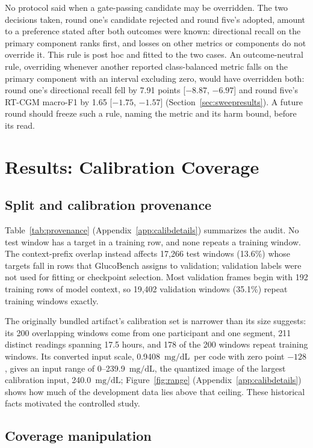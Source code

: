 \documentclass[10pt,twocolumn]{article}
\newcommand{\mgdl}{\ensuremath{\mathrm{mg/dL}}}
\begin{document}
No protocol said when a gate-passing candidate may be overridden. The two
decisions taken, round one's candidate rejected and round five's adopted,
amount to a preference stated after both outcomes were known: directional
recall on the primary component ranks first, and losses on other metrics
or components do not override it. This rule is post hoc and fitted to the
two cases. An outcome-neutral rule, overriding whenever another reported
class-balanced metric falls on the primary component with an interval
excluding zero, would have overridden both: round one's directional
recall fell by 7.91 points [$-8.87$, $-6.97$] and round five's RT-CGM
macro-F1 by 1.65 [$-1.75$, $-1.57$] (Section~\ref{sec:sweepresults}). A
future round should freeze such a rule, naming the metric and its harm
bound, before its read.

\section{Results: Calibration Coverage}

\subsection{Split and calibration provenance}
\label{sec:provenance}

Table~\ref{tab:provenance} (Appendix~\ref{app:calibdetails}) summarizes
the audit. No test window has a target
in a training row, and none repeats a training window. The context-prefix
overlap instead affects 17,266 test windows (13.6\%) whose targets fall in rows
that GlucoBench assigns to validation; validation labels were not used for
fitting or checkpoint selection. Most validation frames begin with 192
training rows of model context, so 19,402 validation windows (35.1\%) repeat
training windows exactly.

The originally bundled artifact's calibration set is narrower than its size
suggests: its 200 overlapping windows come from one participant and one
segment, 211 distinct readings spanning 17.5 hours, and 178 of the 200
windows repeat training windows. Its converted input scale, 0.9408~\mgdl\
per code with zero point $-128$, gives an input range of 0--239.9~\mgdl,
the quantized image of the largest calibration input, 240.0~\mgdl;
Figure~\ref{fig:range} (Appendix~\ref{app:calibdetails}) shows how much of
the development data lies above that ceiling. These historical facts
motivated the controlled study.

\subsection{Coverage manipulation}
\end{document}
